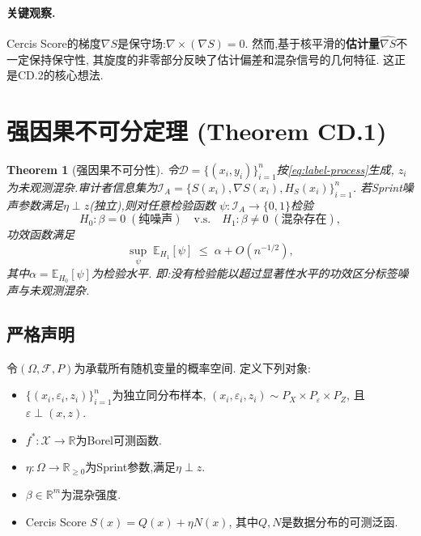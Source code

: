 \documentclass[12pt,a4paper]{article}
\newtheorem{theorem}{Theorem}[section]
\newcommand{\R}{\mathbb{R}}
\newcommand{\E}{\mathbb{E}}
\newcommand{\cX}{\mathcal{X}}
\newcommand{\cD}{\mathcal{D}}
\newcommand{\cF}{\mathcal{F}}
\newcommand{\cI}{\mathcal{I}}
\newcommand{\curl}{\nabla\! \times\!}
\newcommand{\grad}{\nabla}
\begin{document}
\paragraph{关键观察.}
Cercis Score的梯度$\grad S$是保守场:$\curl(\grad S) = 0$.
然而,基于核平滑的\textbf{估计量}$\widehat{\grad S}$不一定保持保守性,
其旋度的非零部分反映了估计偏差和混杂信号的几何特征.
这正是CD.2的核心想法.

\section{强因果不可分定理 (Theorem CD.1)}
\label{sec:strong}

\begin{theorem}[强因果不可分性]\label{thm:strong-insep}
    令$\cD = \{(x_i, y_i)\}_{i=1}^n$按\eqref{eq:label-process}生成,
    $z_i$为未观测混杂.审计者信息集为$\cI_A = \{S(x_i), \nabla S(x_i), H_S(x_i)\}_{i=1}^n$.
    若Sprint噪声参数满足$\eta \perp z$(独立),则对任意检验函数
    $\psi: \cI_A \to \{0,1\}$检验
    \begin{equation*}
        H_0: \beta = 0\;(\text{纯噪声}) \quad\text{v.s.}\quad
        H_1: \beta \neq 0\;(\text{混杂存在}),
    \end{equation*}
    功效函数满足
    \begin{equation}\label{eq:power-bound}
        \sup_{\psi}\; \E_{H_1}[\psi] \;\leq\; \alpha + O(n^{-1/2}),
    \end{equation}
    其中$\alpha = \E_{H_0}[\psi]$为检验水平.
    即:没有检验能以超过显著性水平的功效区分标签噪声与未观测混杂.
\end{theorem}

\subsection{严格声明}

令$(\Omega, \cF, P)$为承载所有随机变量的概率空间.
定义下列对象:
\begin{itemize}
    \item $\{(x_i, \varepsilon_i, z_i)\}_{i=1}^n$为独立同分布样本,
          $(x_i, \varepsilon_i, z_i) \sim P_X \times P_\varepsilon \times P_Z$,
          且$\varepsilon \perp (x,z)$.
    \item $f^*: \cX \to \R$为Borel可测函数.
    \item $\eta: \Omega \to \R_{\geq 0}$为Sprint参数,满足$\eta \perp z$.
    \item $\beta \in \R^m$为混杂强度.
    \item Cercis Score $S(x) = Q(x) + \eta N(x)$,
          其中$Q, N$是数据分布的可测泛函.
\end{itemize}
\end{document}
